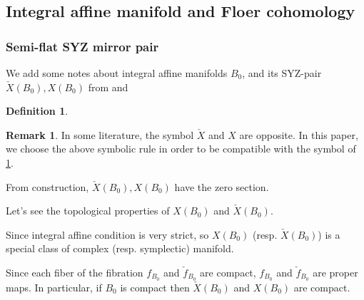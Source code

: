 \documentclass[a4paper,dvipdfmx,reqno,12pt]{amsart}
\theoremstyle{definition}
\newtheorem{definition}[theorem]{Definition}
\newtheorem{remark}[theorem]{Remark}
\numberwithin{equation}{section}
\begin{document}
\subsection{Integral affine manifold and Floer cohomology}

\subsubsection{Semi-flat SYZ mirror pair}

We add some notes about integral affine manifolds $B_0$, and its SYZ-pair $\check{X}(B_0), X(B_0)$ from \cite[Chapter 6]{MR2567952} and \cite{MR2737696,MR3079343}

\begin{definition}
\label{definition-SYZ-torus-fibration}
\end{definition}

\begin{remark}
In some literature, the symbol $\check{X}$ and
$X$ are opposite. In this paper, we choose the above
symbolic rule in order to be compatible with the symbol of 
\cref{definition-SYZ-torus-fibration}.
\end{remark}

From construction, $\check{X}(B_0), X(B_0)$ have the zero section.

Let's see the topological properties of $X(B_0)$ and $\check{X}(B_0)$.

Since integral affine condition is very strict, so $X(B_0)$ (resp. $\check{X}(B_0)$) is a special class of complex (resp. symplectic) manifold.

Since each fiber of the fibration $f_{B_0}$ and 
$\check{f}_{B_0}$ are compact,
$f_{B_0}$ and $\check{f}_{B_0}$ are proper maps.
In particular, if $B_0$ is compact then 
$\check{X}(B_0)$ and $X(B_0)$ are compact.
\end{document}

